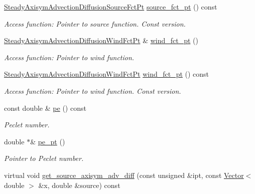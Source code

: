 \begin{DoxyCompactItemize}
\hyperlink{classoomph_1_1SteadyAxisymAdvectionDiffusionEquations_a1a8121ed2ce92dc69aa85c71975489d0}{Steady\+Axisym\+Advection\+Diffusion\+Source\+Fct\+Pt} \hyperlink{classoomph_1_1SteadyAxisymAdvectionDiffusionEquations_a0d539f7d7024cdefd9ec14be1c3d3ce1}{source\+\_\+fct\+\_\+pt} () const
\begin{DoxyCompactList}\small\item\em Access function\+: Pointer to source function. Const version. \end{DoxyCompactList}\item 
\hyperlink{classoomph_1_1SteadyAxisymAdvectionDiffusionEquations_af8fad98c36589cff579a35bd32641b25}{Steady\+Axisym\+Advection\+Diffusion\+Wind\+Fct\+Pt} \& \hyperlink{classoomph_1_1SteadyAxisymAdvectionDiffusionEquations_a725fab19401c9e97023b2099bd9c29ed}{wind\+\_\+fct\+\_\+pt} ()
\begin{DoxyCompactList}\small\item\em Access function\+: Pointer to wind function. \end{DoxyCompactList}\item 
\hyperlink{classoomph_1_1SteadyAxisymAdvectionDiffusionEquations_af8fad98c36589cff579a35bd32641b25}{Steady\+Axisym\+Advection\+Diffusion\+Wind\+Fct\+Pt} \hyperlink{classoomph_1_1SteadyAxisymAdvectionDiffusionEquations_a8f4ab2d2f2c0eabb37699689cfd2ac2b}{wind\+\_\+fct\+\_\+pt} () const
\begin{DoxyCompactList}\small\item\em Access function\+: Pointer to wind function. Const version. \end{DoxyCompactList}\item 
const double \& \hyperlink{classoomph_1_1SteadyAxisymAdvectionDiffusionEquations_a2ebfde954ef0bbefd65e15f5f615eae0}{pe} () const
\begin{DoxyCompactList}\small\item\em Peclet number. \end{DoxyCompactList}\item 
double $\ast$\& \hyperlink{classoomph_1_1SteadyAxisymAdvectionDiffusionEquations_ac5f024e0f089e616ec480bc2afc3443c}{pe\+\_\+pt} ()
\begin{DoxyCompactList}\small\item\em Pointer to Peclet number. \end{DoxyCompactList}\item 
virtual void \hyperlink{classoomph_1_1SteadyAxisymAdvectionDiffusionEquations_a3e934ba20c0415976c8ef68e639c245a}{get\+\_\+source\+\_\+axisym\+\_\+adv\+\_\+diff} (const unsigned \&ipt, const \hyperlink{classoomph_1_1Vector}{Vector}$<$ double $>$ \&x, double \&source) const

\end{DoxyCompactItemize}
